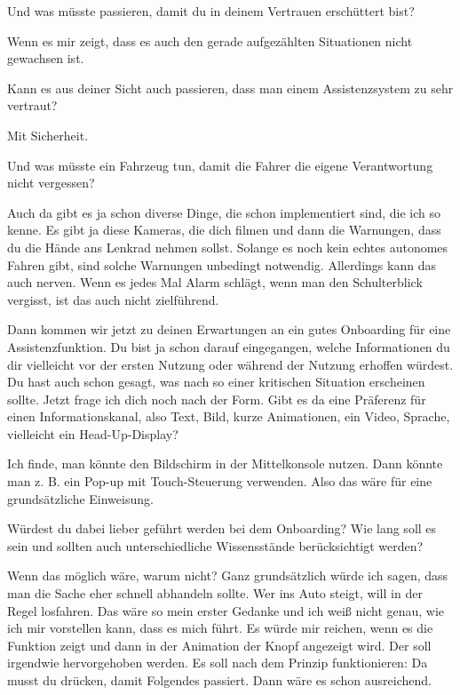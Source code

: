 \interviewerin
Und was müsste passieren, damit du in deinem Vertrauen erschüttert bist?

Wenn es mir zeigt, dass es auch den gerade aufgezählten Situationen
nicht gewachsen ist.

\interviewerin
Kann es aus deiner Sicht auch passieren, dass man einem Assistenzsystem
zu sehr vertraut?

Mit Sicherheit.

\interviewerin
Und was müsste ein Fahrzeug tun, damit die Fahrer die eigene
Verantwortung nicht vergessen?

Auch da gibt es ja schon diverse Dinge, die schon implementiert sind,
die ich so kenne. Es gibt ja diese Kameras, die dich filmen und dann die
Warnungen, dass du die Hände ans Lenkrad nehmen sollst. Solange es noch
kein echtes autonomes Fahren gibt, sind solche Warnungen unbedingt
notwendig. Allerdings kann das auch nerven. Wenn es jedes Mal Alarm
schlägt, wenn man den Schulterblick vergisst, ist das auch nicht
zielführend.

\interviewerin
Dann kommen wir jetzt zu deinen Erwartungen an ein gutes Onboarding für
eine Assistenzfunktion. Du bist ja schon darauf eingegangen, welche
Informationen du dir vielleicht vor der ersten Nutzung oder während der
Nutzung erhoffen würdest. Du hast auch schon gesagt, was nach so einer
kritischen Situation erscheinen sollte. Jetzt frage ich dich noch nach
der Form. Gibt es da eine Präferenz für einen Informationskanal, also
Text, Bild, kurze Animationen, ein Video, Sprache, vielleicht ein
Head-Up-Display?

Ich finde, man könnte den Bildschirm in der Mittelkonsole nutzen. Dann
könnte man z. B. ein Pop-up mit Touch-Steuerung verwenden. Also das wäre
für eine grundsätzliche Einweisung.

\interviewerin
Würdest du dabei lieber geführt werden bei dem Onboarding? Wie lang
soll es sein und sollten auch unterschiedliche Wissensstände
berücksichtigt werden?

Wenn das möglich wäre, warum nicht? Ganz grundsätzlich würde ich sagen,
dass man die Sache eher schnell abhandeln sollte. Wer ins Auto steigt,
will in der Regel losfahren. Das wäre so mein erster Gedanke und ich
weiß nicht genau, wie ich mir vorstellen kann, dass es mich führt. Es
würde mir reichen, wenn es die Funktion zeigt und dann in der Animation
der Knopf angezeigt wird. Der soll irgendwie hervorgehoben werden. Es
soll nach dem Prinzip funktionieren: Da musst du drücken, damit
Folgendes passiert. Dann wäre es schon ausreichend.

